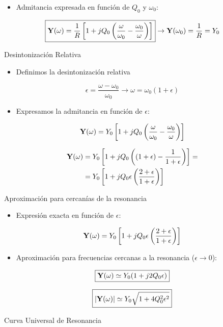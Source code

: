 \begin{itemize}
\item Admitancia expresada en función de \(Q_0\) y \(\omega_0\):
\end{itemize}
\[
  \boxed{\mathbf{Y}(\omega) = \frac{1}{R} \left[1 + j Q_0 \left(\frac{\omega}{\omega_0} - \frac{\omega_0}{\omega}\right)\right]} \rightarrow \mathbf{Y}(\omega_0) = \frac{1}{R} = Y_0
\]

{Desintonización Relativa}


\begin{itemize}
\item Definimos la desintonización relativa
\end{itemize}

\[
  \epsilon = \frac{\omega - \omega_0}{\omega_0} \rightarrow \omega = \omega_0 (1 + \epsilon)
\]

\begin{itemize}
\item Expresamos la admitancia en función de \(\epsilon\):
\end{itemize}
\[
  \mathbf{Y}(\omega) = Y_0 \left[1 + j Q_0 \left(\frac{\omega}{\omega_0} - \frac{\omega_0}{\omega}\right)\right]
\]

\begin{align*}
  \mathbf{Y}(\omega) &= Y_0 \left[ 1 + j Q_0 \left((1 + \epsilon) - \frac{1}{1 + \epsilon}\right)\right] =\\
            &= Y_0 \left[ 1 + j Q_0 \epsilon\left(\frac{2 + \epsilon}{1 + \epsilon}\right)\right]
\end{align*}

{Aproximación para cercanías de la resonancia}

\begin{itemize}
\item Expresión exacta en función de \(\epsilon\):
\end{itemize}

\[
  \mathbf{Y}(\omega) = Y_0 \left[ 1 + j Q_0 \epsilon\left(\frac{2 + \epsilon}{1 + \epsilon}\right)\right]
\]  

\begin{itemize}
\item Aproximación para frecuencias cercanas a la resonancia (\(\epsilon \to 0\)):
\end{itemize}

\[
  \boxed{\mathbf{Y}(\omega) \simeq Y_0 (1 + j 2 Q_0 \epsilon)}
\]

\[
  \boxed{|\mathbf{Y}(\omega)| \simeq Y_0 \sqrt{1 + 4 Q^2_0 \epsilon^2}}
\]

{Curva Universal de Resonancia}


